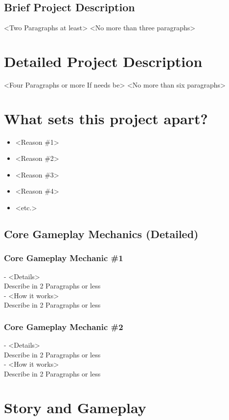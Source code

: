 \documentclass[14pt]{article}
\begin{document}
\subsection{Brief Project Description}
<Two Paragraphs at least>
<No more than three paragraphs>
\pagebreak


\section{Detailed Project Description}
<Four Paragraphs or more If needs be>
<No more than six paragraphs>
\pagebreak


\section{What sets this project apart?}
\begin{itemize}
    \item <Reason \#1>
	\item <Reason \#2>
	\item <Reason \#3>
	\item <Reason \#4>
	\item <etc.>
\end{itemize}

\subsection{Core Gameplay Mechanics (Detailed)}
\subsubsection{Core Gameplay Mechanic \#1}
- <Details> \\
    Describe in 2 Paragraphs or less \\
- <How it works> \\
    Describe in 2 Paragraphs or less

\subsubsection{Core Gameplay Mechanic \#2}
- <Details> \\
    Describe in 2 Paragraphs or less \\
- <How it works> \\
    Describe in 2 Paragraphs or less   

\pagebreak
\section{Story and Gameplay}
\end{document}
